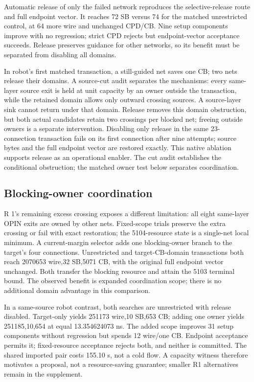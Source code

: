 \documentclass[conference,10pt]{IEEEtran}
\begin{document}
Automatic release of only the failed network reproduces the selective-release route and full endpoint vector. It reaches 72 SB versus 74 for the matched unrestricted control, at 64 more wire and unchanged CPD/CB. Nine setup components improve with no regression; strict CPD rejects but endpoint-vector acceptance succeeds. Release preserves guidance for other networks, so its benefit must be separated from disabling all domains.

In robot's first matched transaction, a still-guided net saves one CB; two nets release their domains. A source-cut audit separates the mechanisms: every same-layer source exit is held at unit capacity by an owner outside the transaction, while the retained domain allows only outward crossing sources. A source-layer sink cannot return under that domain. Release removes this domain obstruction, but both actual candidates retain two crossings per blocked net; freeing outside owners is a separate intervention. Disabling only release in the same 23-connection transaction fails on its first connection after nine attempts; source bytes and the full endpoint vector are restored exactly. This native ablation supports release as an operational enabler. The cut audit establishes the conditional obstruction; the matched owner test below separates coordination.

\subsection{Blocking-owner coordination}
R 1's remaining excess crossing exposes a different limitation: all eight same-layer OPIN exits are owned by other nets. Fixed-scope trials preserve the extra crossing or fail with exact restoration; the 5104-resource state is a single-net local minimum. A current-margin selector adds one blocking-owner branch to the target's four connections. Unrestricted and target-CB-domain transactions both reach 2070653 wire,32 SB,5071 CB, with the original full endpoint vector unchanged. Both transfer the blocking resource and attain the 5103 terminal bound. The observed benefit is expanded coordination scope; there is no additional domain advantage in this comparison.

In a same-source robot contrast, both searches are unrestricted with release disabled. Target-only yields 251173 wire,10 SB,653 CB; adding one owner yields 251185,10,654 at equal 13.354624073 ns. The added scope improves 31 setup components without regression but spends 12 wire/one CB. Endpoint acceptance permits it; fixed-resource acceptance rejects both, and neither is committed. The shared imported pair costs 155.10 s, not a cold flow. A capacity witness therefore motivates a proposal, not a resource-saving guarantee; smaller R1 alternatives remain in the supplement.
\end{document}

